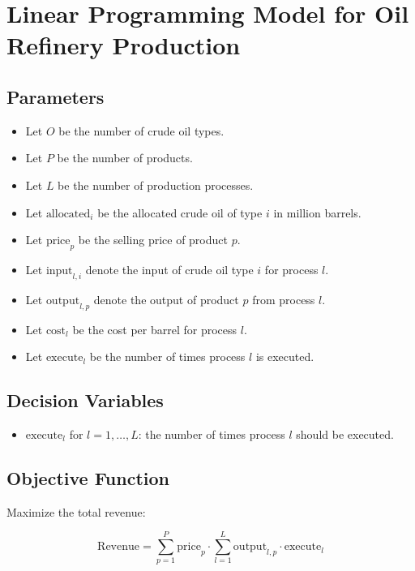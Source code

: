\documentclass{article}
\begin{document}
\section*{Linear Programming Model for Oil Refinery Production}

\subsection*{Parameters}

\begin{itemize}
    \item Let \( O \) be the number of crude oil types.
    \item Let \( P \) be the number of products.
    \item Let \( L \) be the number of production processes.
    \item Let \( \text{allocated}_i \) be the allocated crude oil of type \( i \) in million barrels.
    \item Let \( \text{price}_p \) be the selling price of product \( p \).
    \item Let \( \text{input}_{l,i} \) denote the input of crude oil type \( i \) for process \( l \).
    \item Let \( \text{output}_{l,p} \) denote the output of product \( p \) from process \( l \).
    \item Let \( \text{cost}_l \) be the cost per barrel for process \( l \).
    \item Let \( \text{execute}_l \) be the number of times process \( l \) is executed.
\end{itemize}

\subsection*{Decision Variables}

\begin{itemize}
    \item \( \text{execute}_l \) for \( l = 1, \ldots, L \): the number of times process \( l \) should be executed.
\end{itemize}

\subsection*{Objective Function}

Maximize the total revenue:

\[
\text{Revenue} = \sum_{p=1}^{P} \text{price}_p \cdot \sum_{l=1}^{L} \text{output}_{l,p} \cdot \text{execute}_l
\]
\end{document}
